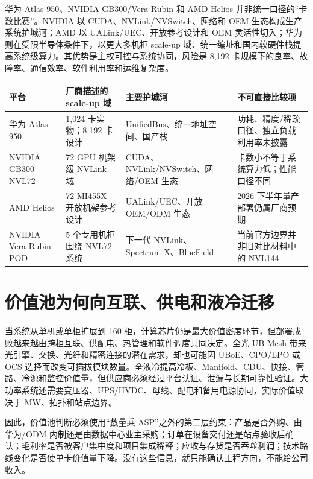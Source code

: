 华为 Atlas 950、NVIDIA GB300/Vera Rubin 和 AMD Helios 并非统一口径的“卡数比赛”。NVIDIA 以 CUDA、NVLink/NVSwitch、网络和 OEM 生态构成生产系统护城河；AMD 以 UALink/UEC、开放参考设计和 OEM 灵活性切入；华为则在受限半导体条件下，以更大多机柜 scale-up 域、统一编址和国内软硬件栈提高系统级算力。其优势是主权可控与系统协同，风险是 8,192 卡规模下的良率、故障率、通信效率、软件利用率和运维复杂度。

\begin{exhibitbox}
\begin{tabularx}{\textwidth}{L{2.5cm}L{3cm}L{3.2cm}X}
\toprule
\textbf{平台} & \textbf{厂商描述的 scale-up 域} & \textbf{主要护城河} & \textbf{不可直接比较项}\\
\midrule
华为 Atlas 950 & 1,024 卡实物；8,192 卡设计 & UnifiedBus、统一地址空间、国产栈 & 功耗、精度/稀疏口径、独立负载利用率未披露\\
NVIDIA GB300 NVL72 & 72 GPU 机架级 NVLink 域 & CUDA、NVLink/NVSwitch、网络/OEM 生态 & 卡数小不等于系统算力低；性能口径不同\\
AMD Helios & 72 MI455X 开放机架参考设计 & UALink/UEC、开放 OEM/ODM 生态 & 2026 下半年量产部署仍属厂商预期\\
NVIDIA Vera Rubin POD & 5 个专用机柜围绕 NVL72 系统 & 下一代 NVLink、Spectrum-X、BlueField & 当前官方边界并非旧对比材料中的 NVL144\\
\bottomrule
\end{tabularx}
\end{exhibitbox}

\section{价值池为何向互联、供电和液冷迁移}

当系统从单机或单柜扩展到 160 柜，计算芯片仍是最大价值密度环节，但部署成败越来越由跨柜互联、供配电、热管理和软件调度共同决定。全光 UB-Mesh 带来光引擎、交换、光纤和精密连接的潜在需求，却也可能因 UBoE、CPO/LPO 或 OCS 选择而改变可插拔模块数量。全液冷提高冷板、Manifold、CDU、快接、管路、冷源和监控价值量，但供应商必须经过平台认证、泄漏与长期可靠性验证。大功率系统还需要变压器、UPS/HVDC、母线、配电和备用电源协同，实际价值取决于 MW、拓扑和站点边界。

因此，价值池判断必须使用“数量乘 ASP”之外的第二层约束：产品是否外购、由华为/ODM 内制还是由数据中心业主采购；订单在设备交付还是站点验收后确认；毛利率是否被客户集中度和项目集成稀释；应收与存货是否吞噬利润；技术路线变化是否使单卡价值量下降。没有这些信息，就只能确认工程方向，不能给公司收入。

